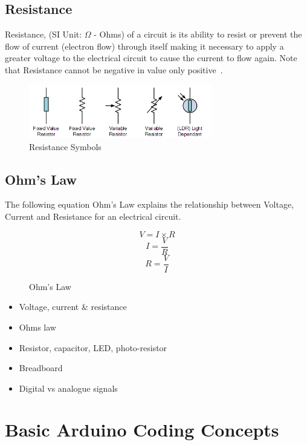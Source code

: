 \newpage
\subsection*{Resistance}
Resistance, (SI Unit: $\Omega$ - Ohms) of a circuit is its ability to resist or prevent the flow of current (electron flow) through itself making it necessary to apply a greater voltage to the electrical circuit to cause the current to flow again. Note that Resistance cannot be negative in value only positive~\citep{et-15}.

%
\begin{figure}[ht]
	\centering
	\includegraphics[width=8cm]{images/04}
	\caption{Resistance Symbols \citep{et-15}}
	\label{fig:resistance_symbols}
\end{figure}
%

\subsection*{Ohm's Law}
The following equation Ohm's Law explains the relationship between Voltage, Current and Resistance for an electrical circuit.

%
\begin{figure}[ht]
	\centering
	\begin{equation}
	V = I \times R
	\end{equation}
	\begin{equation}
	I = \frac{V}{R}
	\end{equation}
	\begin{equation}
	R = \frac{V}{I} 
	\end{equation}
	\caption{Ohm's Law}
	\label{fig:ohms_law_equation}
\end{figure}
%


\begin{itemize}
	\item Voltage, current \& resistance
	\item Ohms law
	\item Resistor, capacitor, LED, photo-resistor
	\item Breadboard
	\item Digital vs analogue signals
\end{itemize}


\section*{Basic Arduino Coding Concepts}

